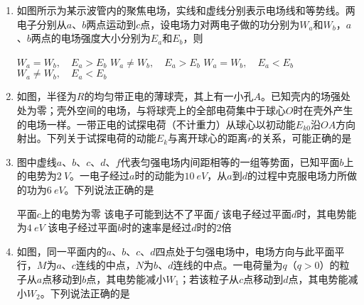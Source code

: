 \begin{enumerate}[leftmargin=0em]
\item
{}
如图所示为某示波管内的聚焦电场，实线和虚线分别表示电场线和等势线。两电子分别从$ a $、$ b $两点运动到$ c $点，设电场力对两电子做的功分别为$ W_a $和$ W_b $，$ a $、$ b $两点的电场强度大小分别为$ E_a $和$ E_b $，则  
\begin{figure}[h!]
\centering

\end{figure}

\fourchoices
{$W _ { a } = W _ { b } , \quad E _ { a } > E _ { b }$}
{$W _ { a } \neq W _ { b } , \quad E _ { a } > E _ { b }$}
{$W _ { a } = W _ { b } , \quad E _ { a } < E _ { b }$}
{$W _ { a } \neq W _ { b } , \quad E _ { a } < E _ { b }$}




\item
{}
如图，半径为$ R $的均匀带正电的薄球壳，其上有一小孔$ A $。已知壳内的场强处处为零；壳外空间的电场，与将球壳上的全部电荷集中于球心$ O $时在壳外产生的电场一样。一带正电的试探电荷（不计重力）从球心以初动能$ E_{k0} $沿$ OA $方向射出。下列关于试探电荷的动能$ E_{k} $与离开球心的距离$ r $的关系，可能正确的是  
\begin{figure}[h!]
\centering

\end{figure}



\item
{}
图中虚线$ a $、$ b $、$ c $、$ d $、$ f $代表匀强电场内间距相等的一组等势面，已知平面$ b $上的电势为$ 2 \ V $。一电子经过$ a $时的动能为$ 10\ eV $，从$ a $到$ d $的过程中克服电场力所做的功为$ 6\ eV $。下列说法正确的是  
\begin{figure}[h!]
\centering

\end{figure}


\fourchoices
{平面$ c $上的电势为零}
{该电子可能到达不了平面$ f $}
{该电子经过平面$ d $时，其电势能为$ 4\ eV $ }
{该电子经过平面$ b $时的速率是经过$ d $时的$ 2 $倍}





\item
{}
如图，同一平面内的$ a $、$ b $、$ c $、$ d $四点处于匀强电场中，电场方向与此平面平行，$ M $为$ a $、$ c $连线的中点，$ N $为$ b $、$ d $连线的中点。一电荷量为$ q $（$ q>0 $）的粒子从$ a $点移动到$ b $点，其电势能减小$ W_1 $；若该粒子从$ c $点移动到$ d $点，其电势能减小$ W_2 $。下列说法正确的是  
\begin{figure}[h!]
\centering

\end{figure}



\end{enumerate}
